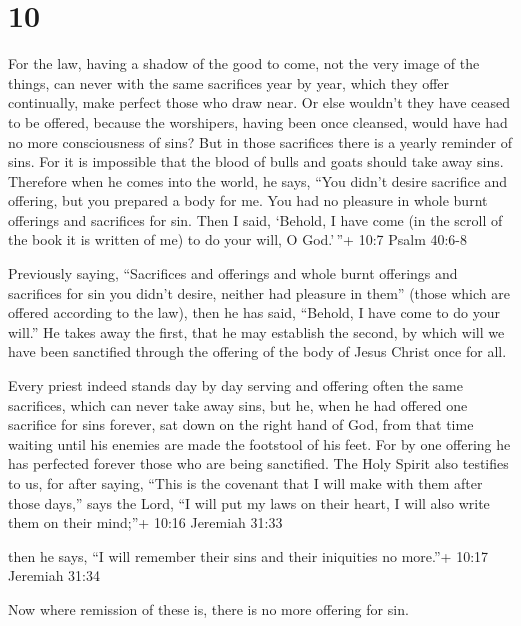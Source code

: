 \hypertarget{section-9}{%
\section{10}\label{section-9}}

 For the law, having a shadow of the good to come, not the
very image of the things, can never with the same sacrifices year by
year, which they offer continually, make perfect those who draw near.
 Or else wouldn't they have ceased to be offered, because
the worshipers, having been once cleansed, would have had no more
consciousness of sins?  But in those sacrifices there is a
yearly reminder of sins.  For it is impossible that the
blood of bulls and goats should take away sins.  Therefore
when he comes into the world, he says, ``You didn't desire sacrifice and
offering, but you prepared a body for me.  You had no
pleasure in whole burnt offerings and sacrifices for sin. 
Then I said, `Behold, I have come (in the scroll of the book it is
written of me) to do your will, O God.'\,''+ 10:7 Psalm 40:6-8

 Previously saying, ``Sacrifices and offerings and whole
burnt offerings and sacrifices for sin you didn't desire, neither had
pleasure in them'' (those which are offered according to the law),
 then he has said, ``Behold, I have come to do your will.''
He takes away the first, that he may establish the second, 
by which will we have been sanctified through the offering of the body
of Jesus Christ once for all.

 Every priest indeed stands day by day serving and offering
often the same sacrifices, which can never take away sins, 
but he, when he had offered one sacrifice for sins forever, sat down on
the right hand of God,  from that time waiting until his
enemies are made the footstool of his feet.  For by one
offering he has perfected forever those who are being sanctified.
 The Holy Spirit also testifies to us, for after saying,
 ``This is the covenant that I will make with them after
those days,'' says the Lord, ``I will put my laws on their heart, I will
also write them on their mind;''+ 10:16 Jeremiah 31:33

then he says,  ``I will remember their sins and their
iniquities no more.''+ 10:17 Jeremiah 31:34

 Now where remission of these is, there is no more offering
for sin.

